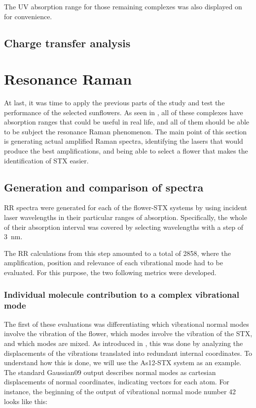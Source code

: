 The UV absorption range for those remaining complexes was also displayed on  for convenience.
\blindtext

\subsection{Charge transfer analysis}
\blindtext

\section{Resonance Raman}
At last, it was time to apply the previous parts of the study and test the performance of the selected sunflowers.
As seen in , all of these complexes have absorption ranges that could be useful in real life, and all of them should be able to be subject the resonance Raman phenomenon.
The main point of this section is generating actual amplified Raman spectra, identifying the lasers that would produce the best amplifications, and being able to select a flower that makes the identification of STX easier.

\subsection{Generation and comparison of spectra}
RR spectra were generated for each of the flower-STX systems by using incident laser wavelengths in their particular ranges of absorption.
Specifically, the whole of their absorption interval was covered by selecting wavelengths with a step of \SI{3}{\nano\metre}.

The RR calculations from this step amounted to a total of 2858, where the amplification, position and relevance of each vibrational mode had to be evaluated.
For this purpose, the two following metrics were developed.

\subsubsection{Individual molecule contribution to a complex vibrational mode}
The first of these evaluations was differentiating which vibrational normal modes involve the vibration of the flower, which modes involve the vibration of the STX, and which modes are mixed.
As introduced in , this was done by analyzing the displacements of the vibrations translated into redundant internal coordinates.
To understand how this is done, we will use the As12-STX system as an example.
The standard Gaussian09 output describes normal modes as cartesian displacements of normal coordinates, indicating vectors for each atom.
For instance, the beginning of the output of vibrational normal mode number 42 looks like this:

